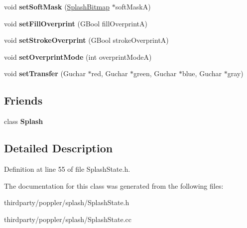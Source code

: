 \begin{DoxyCompactItemize}
\item 
\mbox{\label{class_splash_state_a4b53eb27459c027c22972c534aebb5de}} 
void {\bfseries set\+Soft\+Mask} (\hyperlink{class_splash_bitmap}{Splash\+Bitmap} $\ast$soft\+MaskA)
\item 
\mbox{\label{class_splash_state_a17ba80bf6e7369e6c08c7d09aa2b55a6}} 
void {\bfseries set\+Fill\+Overprint} (G\+Bool fill\+OverprintA)
\item 
\mbox{\label{class_splash_state_a00a214e9e3f44e0890a0377d6b35e2a9}} 
void {\bfseries set\+Stroke\+Overprint} (G\+Bool stroke\+OverprintA)
\item 
\mbox{\label{class_splash_state_ad29c82dae030250bbafc165b419753ee}} 
void {\bfseries set\+Overprint\+Mode} (int overprint\+ModeA)
\item 
\mbox{\label{class_splash_state_a22be048e8ec7fd310a5db86efb600cb5}} 
void {\bfseries set\+Transfer} (Guchar $\ast$red, Guchar $\ast$green, Guchar $\ast$blue, Guchar $\ast$gray)
\end{DoxyCompactItemize}
\subsection*{Friends}
\begin{DoxyCompactItemize}
\item 
\mbox{\label{class_splash_state_a6216f93151b4bec4a72771c40ff08ae8}} 
class {\bfseries Splash}
\end{DoxyCompactItemize}


\subsection{Detailed Description}


Definition at line 55 of file Splash\+State.\+h.



The documentation for this class was generated from the following files\+:\begin{DoxyCompactItemize}
\item 
thirdparty/poppler/splash/Splash\+State.\+h\item 
thirdparty/poppler/splash/Splash\+State.\+cc\end{DoxyCompactItemize}
